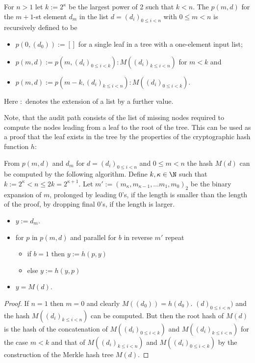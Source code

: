 \begin{definition}
For \(n > 1\) let \(k := 2^\kappa\) be the largest 
power of 2 such that \(k < n\). The  \(p(m, d)\) for 
the \(m+1\)-st element \(d_m\) in the list \(d = (d_i)_{0 \le i < n}\)
with \(0 \le m < n\) is recursively defined to be 
\begin{itemize}
\item \(p(0,(d_0)) := []\) for a single leaf in a tree with a one-element
input list;
\item \(p(m,d) := p(m, (d_i)_{0 \le i < k}) : M( (d_i)_{k \le i < n} )\) for \(m < k\) and
\item \(p(m,d) := p(m-k, (d_i)_{k \le i < n}) : M( (d_i)_{0 \le i < k})  \). 
\end{itemize}
Here \(:\) denotes the extension of a list by a further value.
\end{definition}
Note, that the audit path consists of the list of missing
nodes required to compute the nodes leading from 
a leaf to the root of the tree.
This can be used as a proof that the leaf exists in the tree by the 
properties of the cryptographic hash function \(h\):
\begin{theorem}
From \(p(m,d)\) and \(d_m\) for \(d = (d_i)_{0 \le i < n}\)
and \(0 \le m < n\) the hash \(M(d)\) can be 
computed by the following algorithm. 
Define \(k, \kappa \in \N\) such that \(k := 2^\kappa < n \le 2k = 2^{\kappa+1}.\)
Let \(m' := (m_\kappa,m_{\kappa-1},\ldots m_1,m_0)_2\) be the binary
expansion of \(m\), prolonged by leading 0's, if the length
is smaller than the length of the proof, by dropping final 0's, if the
length is larger.
\begin{itemize}
\item \(y := d_m\).
\item for \(p\) in \(p(m,d)\) and parallel for \(b\) in reverse \(m'\) repeat
	\begin{itemize}
		\item if \(b=1\) then \(y := h(p,y)\)
		\item else \(y := h(y, p)\)
	\end{itemize}
\item \(y = M(d)\).
\end{itemize}
\end{theorem}
\begin{proof}
If \(n=1\) then \(m=0\) and clearly \(M((d_0)) = h(d_0)\).
\((d)_{0 \le i < n})\) and the hash \(M((d_i)_{k \le i < n})\)
can be computed. But then the root hash of \(M(d)\) is the hash
of the concatenation of \(M((d_i)_{0 \le i < k})\) and \(M( (d_i)_{k \le i < n})\) 
for the case \(m < k\) and that of 
\(M((d_i)_{k \le i < n})\) and \(M( (d_i)_{0 \le i < k})\) by the
construction of the Merkle hash tree \(M(d)\).
\end{proof}

